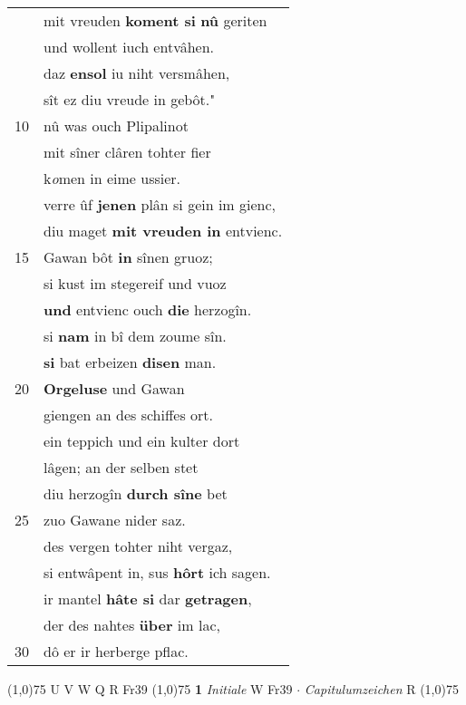 \documentclass[8pt,a4paper,notitlepage]{article}
\begin{document}
\begin{table}[ht]
\begin{minipage}[t]{0.5\linewidth}
\begin{tabular}{rl}
 & mit vreuden \textbf{koment si} \textbf{nû} geriten\\ 
 & und wollent iuch entvâhen.\\ 
 & daz \textbf{en}\textbf{sol} iu niht versmâhen,\\ 
 & sît ez diu vreude in gebôt."\\ 
10 & nû was ouch Plipalinot\\ 
 & mit sîner clâren tohter fier\\ 
 & k\textit{o}men in eime ussier.\\ 
 & verre ûf \textbf{jenen} plân si gein im gienc,\\ 
 & diu maget \textbf{mit vreuden in} entvienc.\\ 
15 & Gawan bôt \textbf{in} sînen gruoz;\\ 
 & si kust im stegereif und vuoz\\ 
 & \textbf{und} entvienc ouch \textbf{die} herzogîn.\\ 
 & si \textbf{nam} in bî dem zoume sîn.\\ 
 & \textbf{si} bat erbeizen \textbf{disen} man.\\ 
20 & \textbf{Orgeluse} und Gawan\\ 
 & giengen an des schiffes ort.\\ 
 & ein teppich und ein kulter dort\\ 
 & lâgen; an der selben stet\\ 
 & diu herzogîn \textbf{durch sîne} bet\\ 
25 & zuo Gawane nider saz.\\ 
 & des vergen tohter niht vergaz,\\ 
 & si entwâpent in, sus \textbf{hôrt} ich sagen.\\ 
 & ir mantel \textbf{hâte si} dar \textbf{getragen},\\ 
 & der des nahtes \textbf{über} im lac,\\ 
30 & dô er ir herberge pflac.\\ 
\end{tabular}
\scriptsize
\line(1,0){75} \newline
U V W Q R Fr39 \newline
\line(1,0){75} \newline
\textbf{1} \textit{Initiale} W Fr39   $\cdot$ \textit{Capitulumzeichen} R  \newline
\line(1,0){75} \newline

\end{minipage}
\end{table}
\end{document}
